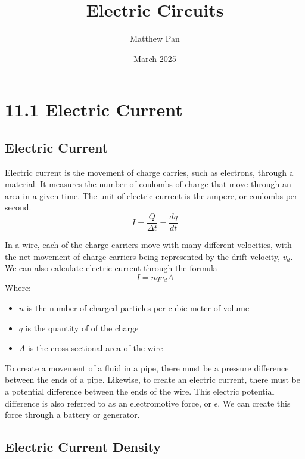 \documentclass[12pt, titlepage]{article}
\title{Electric Circuits}
\author{Matthew Pan}
\date{March 2025}
\begin{document}
\pagestyle{fancy}

\fancyhead{}
\fancyhead[R]{\thepage}

\maketitle

\section*{11.1 Electric Current}
\subsection*{Electric Current}

Electric current is the movement of charge carries, such as electrons, through a material. It measures the number of coulombs of charge that move through an area in a given time. The unit of electric current is the ampere, or coulombs per second.
\begin{equation*}
    I = \frac{Q}{\Delta t} = \frac{dq}{dt}
\end{equation*}

In a wire, each of the charge carriers move with many different velocities, with the net movement of charge carriers being represented by the drift velocity, $v_d$. We can also calculate electric current through the formula 
\begin{equation*}
    I = nqv_{d}A
\end{equation*}
Where:
\begin{itemize}
    \item $n$ is the number of charged particles per cubic meter of volume
    \item $q$ is the quantity of of the charge
    \item $A$ is the cross-sectional area of the wire
\end{itemize}
To create a movement of a fluid in a pipe, there must be a pressure difference between the ends of a pipe. Likewise, to create an electric current, there must be a potential difference between the ends of the wire. This electric potential difference is also referred to as an electromotive force, or $\epsilon$. We can create this force through a battery or generator.
\subsection*{Electric Current Density}
\end{document}

